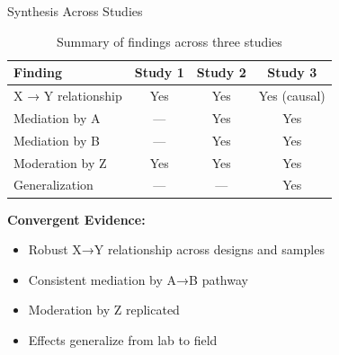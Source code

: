 \documentclass[aspectratio=169,12pt]{beamer}
\begin{document}
\begin{frame}{Synthesis Across Studies}
  \begin{table}
    \centering
    \caption{Summary of findings across three studies}
    \small
    \begin{tabular}{lccc}
      \toprule
      \textbf{Finding} & \textbf{Study 1} & \textbf{Study 2} & \textbf{Study 3} \\
      \midrule
      X → Y relationship & Yes & Yes & Yes (causal) \\
      Mediation by A & --- & Yes & Yes \\
      Mediation by B & --- & Yes & Yes \\
      Moderation by Z & Yes & Yes & Yes \\
      Generalization & --- & --- & Yes \\
      \bottomrule
    \end{tabular}
  \end{table}

  \vspace{0.5cm}

  \textbf{Convergent Evidence:}
  \begin{itemize}
    \item Robust X→Y relationship across designs and samples
    \item Consistent mediation by A→B pathway
    \item Moderation by Z replicated
    \item Effects generalize from lab to field
  \end{itemize}
\end{frame}
\end{document}

